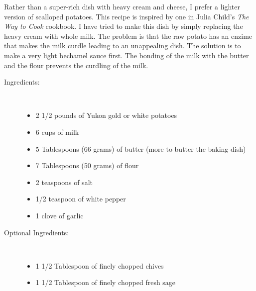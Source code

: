 \documentclass[11pt,letterpaper]{article}
\begin{document}


Rather than a super-rich dish with heavy cream and cheese, I prefer a lighter version of scalloped potatoes. This recipe is inspired by one in Julia Child's {\it The Way to Cook} cookbook. I have tried to make this dish by simply replacing the heavy cream with whole milk. The problem is that the raw potato has an enzime that makes the milk curdle leading to an unappealing dish. The solution is to make a very light bechamel sauce first. The bonding of the milk with the butter and the flour prevents the curdling of the milk. 

\begin{description}

\item[Ingredients:]\ \\
	\begin{itemize}
	\item 2 1/2 pounds of Yukon gold or white potatoes
	\item 6 cups of milk
	\item 5 Tablespoons (66 grams) of butter (more to butter the baking dish)
	\item 7 Tablespoons (50 grams) of flour 
	\item 2 teaspoons of salt
	\item 1/2 teaspoon of white pepper
	\item 1 clove of garlic
	\end{itemize}

\item[Optional Ingredients:]\ \\
	\begin{itemize}
	\item 1 1/2 Tablespoon of finely chopped chives
	\item 1 1/2 Tablespoon of finely chopped fresh sage
	\end{itemize}


\end{description}
\end{document}

